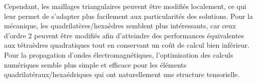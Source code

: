 Cependant, les maillages triangulaires peuvent être modifiés localement, ce qui leur permet de s’adapter plus facilement aux particularités des solutions.
Pour la mécanique, les quadrilatères/hexaèdres semblent plus intéressants, car ceux d'ordre 2 peuvent être modifiés afin d’atteindre des performances équivalentes aux tétraèdres quadratiques tout en conservant un coût de calcul bien inférieur.
Pour la propagation d’ondes électromagnétiques, l'optimisation des calculs numériques semble plus simple et efficace pour les éléments quadrilatéraux/hexaédriques qui ont naturellement une structure tensorielle.


